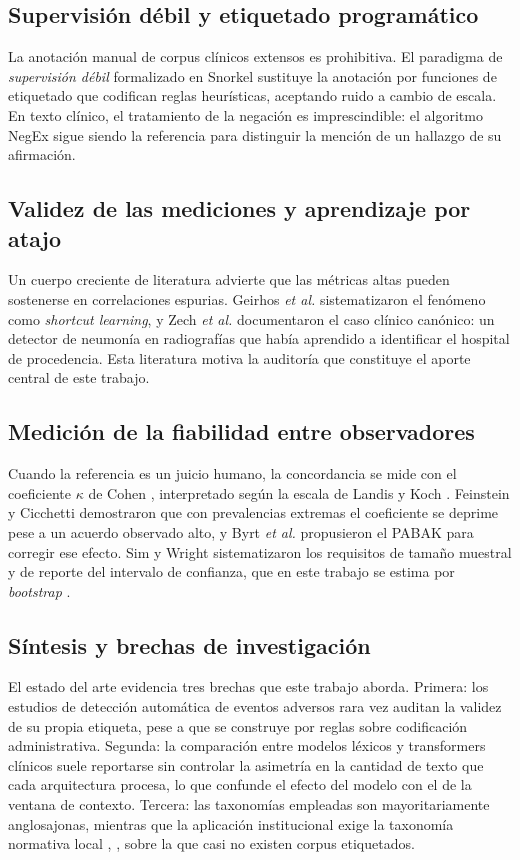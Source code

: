 \documentclass[conference]{IEEEtran}
\begin{document}
\subsection{Supervisión débil y etiquetado programático}
La anotación manual de corpus clínicos extensos es prohibitiva. El paradigma de
\emph{supervisión débil} formalizado en Snorkel \cite{snorkel} sustituye la
anotación por funciones de etiquetado que codifican reglas heurísticas,
aceptando ruido a cambio de escala. En texto clínico, el tratamiento de la
negación es imprescindible: el algoritmo NegEx \cite{negex} sigue siendo la
referencia para distinguir la mención de un hallazgo de su afirmación.

\subsection{Validez de las mediciones y aprendizaje por atajo}
Un cuerpo creciente de literatura advierte que las métricas altas pueden
sostenerse en correlaciones espurias. Geirhos \emph{et al.} \cite{geirhos}
sistematizaron el fenómeno como \emph{shortcut learning}, y Zech \emph{et
al.} \cite{zech} documentaron el caso clínico canónico: un detector de
neumonía en radiografías que había aprendido a identificar el hospital de
procedencia. Esta literatura motiva la auditoría que constituye el aporte
central de este trabajo.

\subsection{Medición de la fiabilidad entre observadores}
Cuando la referencia es un juicio humano, la concordancia se mide con el
coeficiente $\kappa$ de Cohen \cite{cohen}, interpretado según la escala de
Landis y Koch \cite{landis}. Feinstein y Cicchetti \cite{feinstein}
demostraron que con prevalencias extremas el coeficiente se deprime pese a un
acuerdo observado alto, y Byrt \emph{et al.} \cite{byrt} propusieron el
PABAK para corregir ese efecto. Sim y Wright \cite{sim} sistematizaron los
requisitos de tamaño muestral y de reporte del intervalo de confianza, que en
este trabajo se estima por \emph{bootstrap} \cite{efron}.

\subsection{Síntesis y brechas de investigación}
El estado del arte evidencia tres brechas que este trabajo aborda. Primera:
los estudios de detección automática de eventos adversos rara vez auditan la
validez de su propia etiqueta, pese a que se construye por reglas sobre
codificación administrativa. Segunda: la comparación entre modelos léxicos y
transformers clínicos suele reportarse sin controlar la asimetría en la
cantidad de texto que cada arquitectura procesa, lo que confunde el efecto del
modelo con el de la ventana de contexto. Tercera: las taxonomías empleadas son
mayoritariamente anglosajonas, mientras que la aplicación institucional exige
la taxonomía normativa local \cite{directiva02}, \cite{directiva7}, sobre la
que casi no existen corpus etiquetados.
\end{document}
